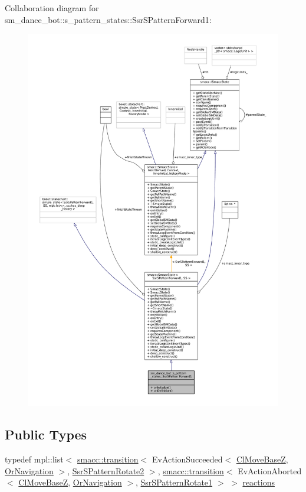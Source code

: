 Collaboration diagram for sm\+\_\+dance\+\_\+bot\+:\+:s\+\_\+pattern\+\_\+states\+:\+:Ssr\+S\+Pattern\+Forward1\+:
\nopagebreak
\begin{figure}[H]
\begin{center}
\leavevmode
\includegraphics[width=350pt]{structsm__dance__bot_1_1s__pattern__states_1_1SsrSPatternForward1__coll__graph}
\end{center}
\end{figure}
\subsection*{Public Types}
\begin{DoxyCompactItemize}
\item 
typedef mpl\+::list$<$ \hyperlink{classsmacc_1_1transition}{smacc\+::transition}$<$ Ev\+Action\+Succeeded$<$ \hyperlink{classmove__base__z__client_1_1ClMoveBaseZ}{Cl\+Move\+BaseZ}, \hyperlink{classsm__dance__bot_1_1OrNavigation}{Or\+Navigation} $>$, \hyperlink{structsm__dance__bot_1_1s__pattern__states_1_1SsrSPatternRotate2}{Ssr\+S\+Pattern\+Rotate2} $>$, \hyperlink{classsmacc_1_1transition}{smacc\+::transition}$<$ Ev\+Action\+Aborted$<$ \hyperlink{classmove__base__z__client_1_1ClMoveBaseZ}{Cl\+Move\+BaseZ}, \hyperlink{classsm__dance__bot_1_1OrNavigation}{Or\+Navigation} $>$, \hyperlink{structsm__dance__bot_1_1s__pattern__states_1_1SsrSPatternRotate1}{Ssr\+S\+Pattern\+Rotate1} $>$ $>$ \hyperlink{structsm__dance__bot_1_1s__pattern__states_1_1SsrSPatternForward1_a803c45f7d5d07bed8cb0907237e5dc27}{reactions}
\end{DoxyCompactItemize}
